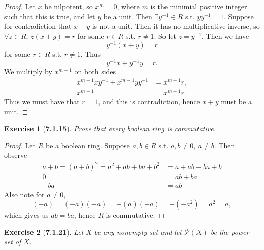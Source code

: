\documentclass[10pt,oneside,reqno]{amsart}
\theoremstyle{plain}
\newtheorem*{e}{Exercise}
\theoremstyle{definition}
\begin{document}
\begin{enumerate}
\begin{enumerate}
\begin{proof}
\vspace{3mm}
Let $x$ be nilpotent, so $x^m = 0$, where $m$ is the minimial positive integer such that this is true, and let $y$ be a unit. Then $\exists y^{-1} \in R$ s.t. $yy^{-1} = 1$. Suppose for contradiction that $x + y$ is not a unit. Then it has no multiplicative inverse, so $\forall z \in R$, $z(x + y) = r$ for some $r \in R$ s.t. $r \neq 1$. So let $z = y^{-1}$. Then we have
\[y^{-1}(x + y) = r\]
for some $r \in R$ s.t. $r \neq 1$. Thus
\[y^{-1}x + y^{-1}y = r.\]
We multiply by $x^{m - 1}$ on both sides
\begin{equation}
\begin{aligned}
x^{m - 1}xy^{-1} + x^{m - 1}yy^{-1} &= x^{m-1}r,\\
x^{m - 1} &= x^{m - 1}r.
\end{aligned}
\end{equation}
Thus we must have that $r = 1$, and this is contradiction, hence $x + y$ must be a unit. 
\end{proof}

\end{enumerate}





\end{enumerate}

\begin{e}[\textbf{7.1.15}]
Prove that every boolean ring is commutative. 
\end{e}

\begin{proof}
Let $R$ be a boolean ring. Suppose $a,b \in R$ s.t. $a,b \neq 0$, $a \neq b$. Then observe
\begin{equation}
\begin{aligned}
a + b = (a + b)^2 = a^2 + ab + ba + b^2 &= a + ab + ba + b\\
0 &= ab + ba\\
-ba &= ab
\end{aligned}
\end{equation}
Also note for $a \neq 0$,
\[(-a) = (-a)(-a) = -(a)(-a) = -(-a^2) = a^2 = a,\]
which gives us $ab = ba$, hence $R$ is commutative. 
\end{proof}
\vspace{3mm}
\begin{e}[\textbf{7.1.21}]
Let $X$ be any nonempty set and let $\mathcal{P}(X)$ be the power set of $X$. 
\end{e}
\end{document}

